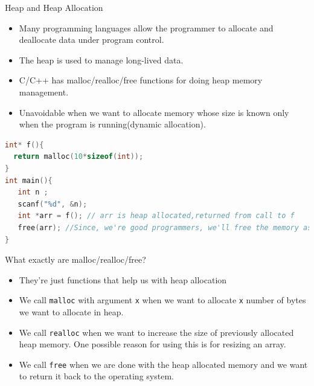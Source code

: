 \documentclass[
  10pt,
  ignorenonframetext,
]{beamer}
\newcommand{\passthrough}[1]{#1}
\providecommand{\tightlist}{%
  \setlength{\itemsep}{0pt}\setlength{\parskip}{0pt}}
\begin{document}
\begin{frame}[fragile]{Heap and Heap Allocation}
\protect\hypertarget{heap-and-heap-allocation}{}
\begin{itemize}
\tightlist
\item
  Many programming languages allow the programmer
  to allocate and deallocate data under program
  control.
\end{itemize}

\pause

\begin{itemize}
\tightlist
\item
  The heap is used to manage long-lived data.
\end{itemize}

\pause

\begin{itemize}
\tightlist
\item
  C/C++ has malloc/realloc/free functions for
  doing heap memory management.
\end{itemize}

\pause

\begin{itemize}
\tightlist
\item
  Unavoidable when we want to allocate memory
  whose size is known only when the program is
  running(dynamic allocation).
\end{itemize}

\pause

\begin{lstlisting}[language=C]
int* f(){
  return malloc(10*sizeof(int));
}
int main(){
   int n ;
   scanf("%d", &n);
   int *arr = f(); // arr is heap allocated,returned from call to f
   free(arr); //Since, we're good programmers, we'll free the memory as well.
}
\end{lstlisting}
\end{frame}

\begin{frame}[fragile]{What exactly are
malloc/realloc/free?}
\protect\hypertarget{what-exactly-are-mallocreallocfree}{}
\begin{itemize}
\tightlist
\item
  They're just functions that help us with heap
  allocation
\item
  We call \passthrough{\lstinline!malloc!} with
  argument \passthrough{\lstinline!x!} when we
  want to allocate \passthrough{\lstinline!x!}
  number of bytes we want to allocate in heap.
\item
  We call \passthrough{\lstinline!realloc!} when
  we want to increase the size of previously
  allocated heap memory. One possible reason for
  using this is for resizing an array.
\item
  We call \passthrough{\lstinline!free!} when we
  are done with the heap allocated memory and we
  want to return it back to the operating system.
\end{itemize}
\end{frame}
\end{document}
